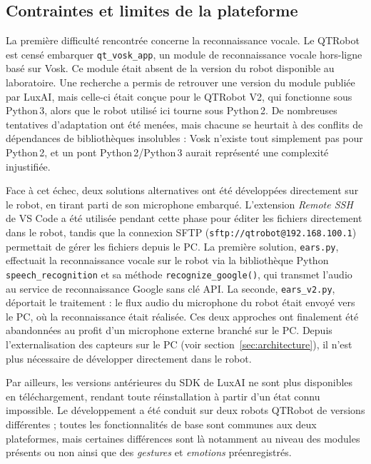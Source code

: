 \documentclass[11pt]{article}
\begin{document}
\subsection{Contraintes et limites de la plateforme}

La première difficulté rencontrée concerne la reconnaissance vocale. Le QTRobot est censé embarquer \texttt{qt\_vosk\_app}, un module de reconnaissance vocale hors-ligne basé sur Vosk. Ce module était absent de la version du robot disponible au laboratoire. Une recherche a permis de retrouver une version du module publiée par LuxAI, mais celle-ci était conçue pour le QTRobot V2, qui fonctionne sous Python\,3, alors que le robot utilisé ici tourne sous Python\,2. De nombreuses tentatives d'adaptation ont été menées, mais chacune se heurtait à des conflits de dépendances de bibliothèques insolubles : Vosk n'existe tout simplement pas pour Python\,2, et un pont Python\,2/Python\,3 aurait représenté une complexité injustifiée.

Face à cet échec, deux solutions alternatives ont été développées directement sur le robot, en tirant parti de son microphone embarqué. L'extension \textit{Remote SSH} de VS Code a été utilisée pendant cette phase pour éditer les fichiers directement dans le robot, tandis que la connexion SFTP (\texttt{sftp://qtrobot@192.168.100.1}) permettait de gérer les fichiers depuis le PC. La première solution, \texttt{ears.py}, effectuait la reconnaissance vocale sur le robot via la bibliothèque Python \texttt{speech\_recognition} et sa méthode \texttt{recognize\_google()}, qui transmet l'audio au service de reconnaissance Google sans clé API. La seconde, \texttt{ears\_v2.py}, déportait le traitement : le flux audio du microphone du robot était envoyé vers le PC, où la reconnaissance était réalisée. Ces deux approches ont finalement été abandonnées au profit d'un microphone externe branché sur le PC. Depuis l'externalisation des capteurs sur le PC (voir section~\ref{sec:architecture}), il n'est plus nécessaire de développer directement dans le robot.

Par ailleurs, les versions antérieures du SDK de LuxAI ne sont plus disponibles en téléchargement, rendant toute réinstallation à partir d'un état connu impossible. Le développement a été conduit sur deux robots QTRobot de versions différentes ; toutes les fonctionnalités de base sont communes aux deux plateformes, mais certaines différences sont là notamment au niveau des modules présents ou non ainsi que des \textit{gestures} et \textit{emotions} préenregistrés.
\end{document}
